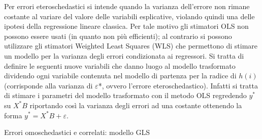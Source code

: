 \documentclass[a4page, 11pt]{article} %
\begin{document}
Per errori eteroschedastici si intende quando la varianza dell’errore non rimane costante al variare del valore delle variabili esplicative, violando quindi una delle ipotesi della regressione lineare classica. Per tale motivo gli stimatori OLS non possono essere usati (in quanto non più efficienti); al contrario si possono utilizzare gli stimatori Weighted Least Squares (WLS) che permettono di stimare un modello per la varianza degli errori condizionata ai regressori. 
Si tratta di definire le seguenti nuove variabili che danno luogo al modello trasformato dividendo ogni variabile contenuta nel modello di partenza per la radice di $h(i)$ (corrisponde alla varianza di $\varepsilon$*, ovvero l'errore eteroschedastico). 
Infatti si tratta di stimare i parametri del modello trasformato con il metodo OLS regredendo $y^*$ su $X^*B$ riportando così la varianza degli errori ad una costante ottenendo la forma $y^* = X^*B + \varepsilon$.
\newline
\begin{itshape}
Errori omoschedastici e correlati: modello GLS
\end{itshape}
\end{document}
